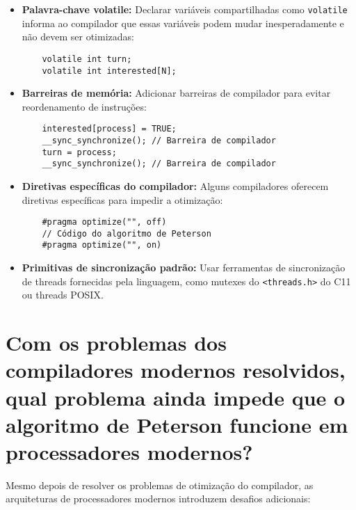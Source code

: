 \documentclass[12pt]{article}
\begin{document}
\begin{itemize}
    \item \textbf{Palavra-chave volatile:} Declarar variáveis compartilhadas como \texttt{volatile} informa ao compilador que essas variáveis podem mudar inesperadamente e não devem ser otimizadas:

    \begin{lstlisting}
    volatile int turn;
    volatile int interested[N];
    \end{lstlisting}

    \item \textbf{Barreiras de memória:} Adicionar barreiras de compilador para evitar reordenamento de instruções:

    \begin{lstlisting}
    interested[process] = TRUE;
    __sync_synchronize(); // Barreira de compilador
    turn = process;
    __sync_synchronize(); // Barreira de compilador
    \end{lstlisting}

    \item \textbf{Diretivas específicas do compilador:} Alguns compiladores oferecem diretivas específicas para impedir a otimização:

    \begin{lstlisting}
    #pragma optimize("", off)
    // Código do algoritmo de Peterson
    #pragma optimize("", on)
    \end{lstlisting}

    \item \textbf{Primitivas de sincronização padrão:} Usar ferramentas de sincronização de threads fornecidas pela linguagem, como mutexes do \texttt{<threads.h>} do C11 ou threads POSIX.
\end{itemize}
\pagebreak
\section{Com os problemas dos compiladores modernos resolvidos, qual problema ainda impede que o algoritmo de Peterson funcione em processadores modernos?}

Mesmo depois de resolver os problemas de otimização do compilador, as arquiteturas de processadores modernos introduzem desafios adicionais:
\end{document}
